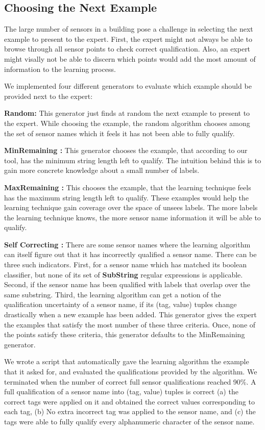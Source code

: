 \subsection{Choosing the Next Example}


The large number of sensors in a building pose a challenge in selecting the next example to present to the expert. First, the expert might not always be able to browse through all sensor points to check correct qualification. Also, an expert might visally not be able to discern which points would add the most amount of information to the learning process. 

We implemented four different generators to evaluate which example should be provided next to the expert:

{\bf Random:} This generator just finds at random the next example to present to the expert. While choosing the example, the random algorithm chooses among the set of sensor names which it feels it has not been able to fully qualify.  

{\bf MinRemaining :} This generator chooses the example, that according to our tool, has the minimum string length left to qualify. The intuition behind this is to gain more concrete knowledge about a small number of labels.

{\bf MaxRemaining :} This chooses the example, that the learning technique feels has the maximum string length left to qualify. These examples would help the learning technique gain coverage over the space of unsees labels. The more labels the learning technique knows, the more sensor name information it will be able to qualify.

{\bf Self Correcting :} There are some sensor names where the learning algorithm can itself figure out that it has incorrectly qualified a sensor name. There can be three such indicators. First, for a sensor name which has matched its boolean classifier, but none of its set of {\bf SubString} regular expressions is applicable. Second, if the sensor name has been qualified with labels that overlap over the same substring. Third, the learning algorithm can get a notion of the qualification uncertainty of a sensor name, if its (tag, value) tuples change drastically when a new example has been added. This generator gives the expert the examples that satisfy the most number of these three criteria. Once, none of the points satisfy these criteria, this generator defaults to the MinRemaining generator.


We wrote a script that automatically gave the learning algorithm the example that it asked for, and evaluated the qualifications provided by the algorithm. We terminated when the number of correct full sensor qualifications reached 90\%. A full qualification of a sensor name into (tag, value) tuples is correct (a) the correct tags were applied on it and  obtained the correct values corresponding to each tag, (b) No extra incorrect tag was applied to the sensor name, and (c) the tags were able to fully qualify every alphanumeric character of the sensor name.

